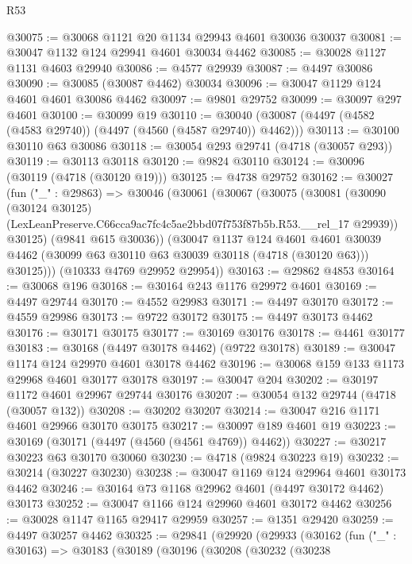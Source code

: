 \begin{lexlean}{R53}
\begin{coremodule}
@30075 := @30068 @1121 @20 @1134 @29943 @4601 @30036 @30037
@30081 := @30047 @1132 @124 @29941 @4601 @30034 @4462
@30085 := @30028 @1127 @1131 @4603 @29940
@30086 := @4577 @29939
@30087 := @4497 @30086
@30090 := @30085 (@30087 @4462) @30034
@30096 := @30047 @1129 @124 @4601 @4601 @30086 @4462
@30097 := @9801 @29752
@30099 := @30097 @297 @4601
@30100 := @30099 @19
@30110 := @30040 (@30087 (@4497 (@4582 (@4583 @29740)) (@4497 (@4560 (@4587 @29740)) @4462)))
@30113 := @30100 @30110 @63 @30086
@30118 := @30054 @293 @29741 (@4718 (@30057 @293))
@30119 := @30113 @30118
@30120 := @9824 @30110
@30124 := @30096 (@30119 (@4718 (@30120 @19)))
@30125 := @4738 @29752
@30162 := @30027
    (fun ("_" : @29863) =>
    @30046
      (@30061
        (@30067
          (@30075
            (@30081
              (@30090
                (@30124 @30125)
                (LexLeanPreserve.C66cca9ac7fc4c5ae2bbd07f753f87b5b.R53.__rel_17 @29939))
              @30125)
            (@9841 @615 @30036))
          (@30047
            @1137
            @124
            @4601
            @4601
            @30039
            @4462
            (@30099 @63 @30110 @63 @30039 @30118 (@4718 (@30120 @63)))
            @30125)))
      (@10333 @4769 @29952 @29954))
@30163 := @29862 @4853
@30164 := @30068 @196
@30168 := @30164 @243 @1176 @29972 @4601
@30169 := @4497 @29744
@30170 := @4552 @29983
@30171 := @4497 @30170
@30172 := @4559 @29986
@30173 := @9722 @30172
@30175 := @4497 @30173 @4462
@30176 := @30171 @30175
@30177 := @30169 @30176
@30178 := @4461 @30177
@30183 := @30168 (@4497 @30178 @4462) (@9722 @30178)
@30189 := @30047 @1174 @124 @29970 @4601 @30178 @4462
@30196 := @30068 @159 @133 @1173 @29968 @4601 @30177 @30178
@30197 := @30047 @204
@30202 := @30197 @1172 @4601 @29967 @29744 @30176
@30207 := @30054 @132 @29744 (@4718 (@30057 @132))
@30208 := @30202 @30207
@30214 := @30047 @216 @1171 @4601 @29966 @30170 @30175
@30217 := @30097 @189 @4601 @19
@30223 := @30169 (@30171 (@4497 (@4560 (@4561 @4769)) @4462))
@30227 := @30217 @30223 @63 @30170 @30060
@30230 := @4718 (@9824 @30223 @19)
@30232 := @30214 (@30227 @30230)
@30238 := @30047 @1169 @124 @29964 @4601 @30173 @4462
@30246 := @30164 @73 @1168 @29962 @4601 (@4497 @30172 @4462) @30173
@30252 := @30047 @1166 @124 @29960 @4601 @30172 @4462
@30256 := @30028 @1147 @1165 @29417 @29959
@30257 := @1351 @29420
@30259 := @4497 @30257 @4462
@30325 := @29841
    (@29920
      (@29933
        (@30162
          (fun ("_" : @30163) =>
          @30183
            (@30189
              (@30196
                (@30208
                  (@30232
                    (@30238

\end{coremodule}
\end{lexlean}
